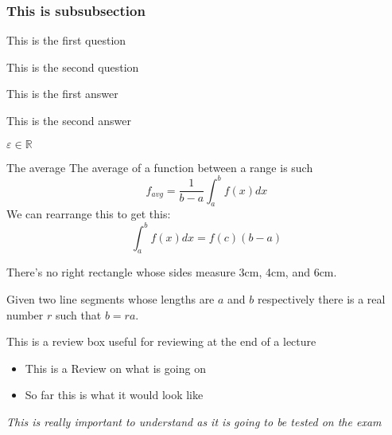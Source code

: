 \documentclass[letterpaper,10pt,twoside,onecolumn,openany]{book}
\begin{document}
\subsubsection{This is subsubsection}
\begin{Questions}
    \item This is the first question 
    \item This is the second question
\end{Questions} 
\begin{Answers}
    \item This is the first answer
    \item This is the second answer
\end{Answers}
\( \varepsilon \in \mathbb{R} \) 
\begin{Definition}{The average}
    The average of a function between a range is such
    \[f_{avg} = \frac{1}{b-a} \int_{a}^{b}f(x)dx\]
    We can rearrange this to get this:
    \[\int_{a}^{b}f(x)dx = f(c)(b-a)\]
\end{Definition}
\lipsum[10]
\begin{Corollary}
    There's no right rectangle whose sides measure 3cm, 4cm, and 6cm.
\end{Corollary}
\begin{Lemma}
    Given two line segments whose lengths are $a$ and $b$ respectively there is a 
real number $r$ such that $b=ra$.
\end{Lemma}
\begin{Review}
    This is a review box useful for reviewing at the end of a lecture
    \begin{itemize}
        \item This is a Review on what is going on
        \item So far this is what it would look like
    \end{itemize}
\end{Review}
\emph{This is really important to understand as it is going to be tested on the exam}
\end{document}

